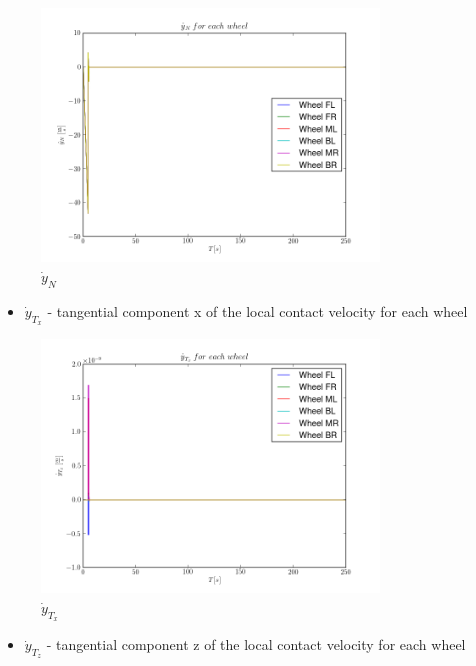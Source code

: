 \begin{figure}[H]
  \centering
    \includegraphics[width=0.8\textwidth]{yNdot}
  \caption{$\dot{y}_{N}$}
\end{figure}

\begin{itemize}
  \item $\dot{y}_{T_x}$ - tangential component x of the local contact velocity for each wheel
\end{itemize}

\begin{figure}[H]
  \centering
    \includegraphics[width=0.8\textwidth]{yTxdot}
  \caption{$\dot{y}_{T_x}$}
\end{figure}

\begin{itemize}
  \item $\dot{y}_{T_z}$ - tangential component z of the local contact velocity for each wheel
\end{itemize}

